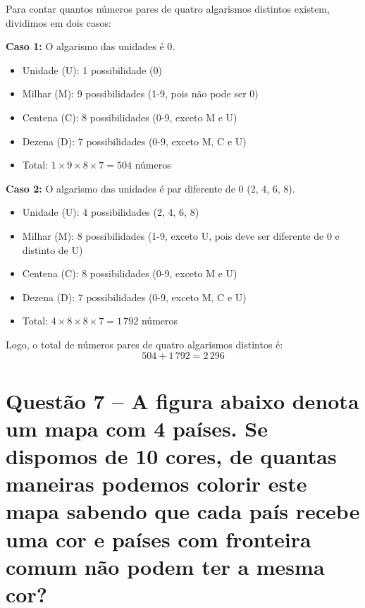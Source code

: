 \documentclass[12pt,a4paper]{article}
\begin{document}
    Para contar quantos números pares de quatro algarismos distintos existem, dividimos em dois casos:

    \textbf{Caso 1:} O algarismo das unidades é 0.
    \begin{itemize}
        \item Unidade (U): 1 possibilidade (0)
        \item Milhar (M): 9 possibilidades (1-9, pois não pode ser 0)
        \item Centena (C): 8 possibilidades (0-9, exceto M e U)
        \item Dezena (D): 7 possibilidades (0-9, exceto M, C e U)
        \item Total: $1 \times 9 \times 8 \times 7 = 504$ números
    \end{itemize}

    \textbf{Caso 2:} O algarismo das unidades é par diferente de 0 (2, 4, 6, 8).
    \begin{itemize}
        \item Unidade (U): 4 possibilidades (2, 4, 6, 8)
        \item Milhar (M): 8 possibilidades (1-9, exceto U, pois deve ser diferente de 0 e distinto de U)
        \item Centena (C): 8 possibilidades (0-9, exceto M e U)
        \item Dezena (D): 7 possibilidades (0-9, exceto M, C e U)
        \item Total: $4 \times 8 \times 8 \times 7 = 1\,792$ números
    \end{itemize}

    Logo, o total de números pares de quatro algarismos distintos é:
    \[
    504 + 1\,792 = \boxed{2\,296}
    \]

\section*{Questão 7 -- A figura abaixo denota um mapa com 4 países. Se dispomos de 10 cores, de
quantas maneiras podemos colorir este mapa sabendo que cada país recebe
uma cor e países com fronteira comum não podem ter a mesma cor?}

    \vspace{0.5cm}

    \begin{center}
    \end{center}
\end{document}
